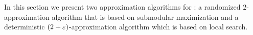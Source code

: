 
In this section we present two approximation algorithms for \carpool:
a randomized $2$-approximation algorithm that is based on submodular
maximization and a deterministic $(2+\varepsilon)$-approximation algorithm
which is based on local search.
 
